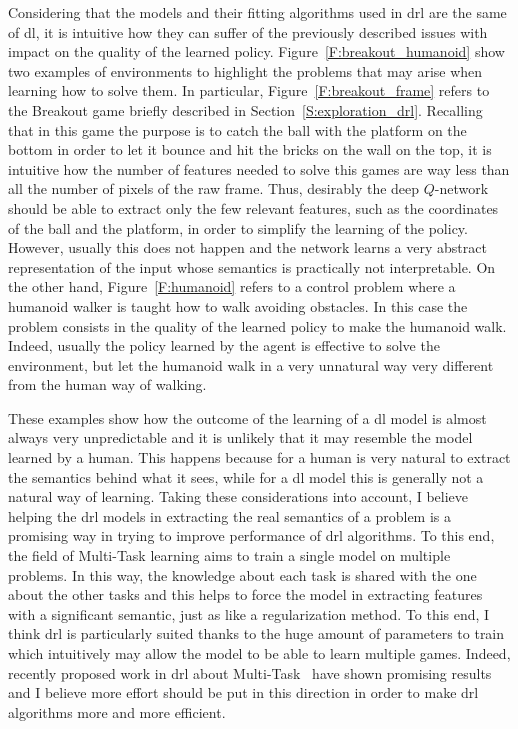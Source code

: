 Considering that the models and their fitting algorithms used in \gls{drl} are the same of \gls{dl}, it is intuitive how they can suffer of the previously described issues with impact on the quality of the learned policy. Figure~\ref{F:breakout_humanoid} show two examples of environments to highlight the problems that may arise when learning how to solve them. In particular, Figure~\ref{F:breakout_frame} refers to the Breakout game briefly described in Section~\ref{S:exploration_drl}. Recalling that in this game the purpose is to catch the ball with the platform on the bottom in order to let it bounce and hit the bricks on the wall on the top, it is intuitive how the number of features needed to solve this games are way less than all the number of pixels of the raw frame. Thus, desirably the deep $Q$-network should be able to extract only the few relevant features, such as the coordinates of the ball and the platform, in order to simplify the learning of the policy. However, usually this does not happen and the network learns a very abstract representation of the input whose semantics is practically not interpretable. On the other hand, Figure~\ref{F:humanoid} refers to a control problem where a humanoid walker is taught how to walk avoiding obstacles. In this case the problem consists in the quality of the learned policy to make the humanoid walk. Indeed, usually the policy learned by the agent is effective to solve the environment, but let the humanoid walk in a very unnatural way very different from the human way of walking.

These examples show how the outcome of the learning of a \gls{dl} model is almost always very unpredictable and it is unlikely that it may resemble the model learned by a human. This happens because for a human is very natural to extract the semantics behind what it sees, while for a \gls{dl} model this is generally not a natural way of learning. Taking these considerations into account, I believe helping the \gls{drl} models in extracting the real semantics of a problem is a promising way in trying to improve performance of \gls{drl} algorithms. To this end, the field of Multi-Task learning aims to train a single model on multiple problems. In this way, the knowledge about each task is shared with the one about the other tasks and this helps to force the model in extracting features with a significant semantic, just as like a regularization method. To this end, I think \gls{drl} is particularly suited thanks to the huge amount of parameters to train which intuitively may allow the model to be able to learn multiple games. Indeed, recently proposed work in \gls{drl} about Multi-Task~\cite{higgins2017darla, ammar2014online, teh2017distral} have shown promising results and I believe more effort should be put in this direction in order to make \gls{drl} algorithms more and more efficient.